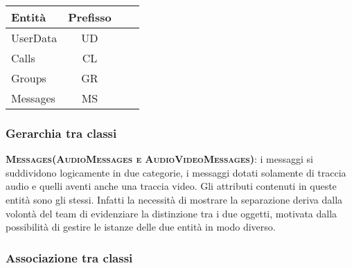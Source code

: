 \begin{center}
\begin{tabular}{lccc}
\toprule
Entità & Prefisso\\
\midrule %
UserData & UD \\
Calls & CL \\
Groups & GR \\
Messages & MS\\
\bottomrule
\end{tabular}
\end{center}

\subsubsection{Gerarchia tra classi}

\begin{description}
	\item{\scshape\bfseries Messages(AudioMessages e AudioVideoMessages)}: i messaggi si suddividono logicamente in due categorie, i messaggi dotati solamente di traccia audio e quelli aventi anche una traccia video. Gli attributi contenuti in queste entità sono gli stessi. Infatti la necessità di mostrare la separazione deriva dalla volontà del team di evidenziare la distinzione tra i due oggetti, motivata dalla possibilità di gestire le istanze delle due entità in modo diverso.
\end{description}

\subsubsection{Associazione tra classi}

